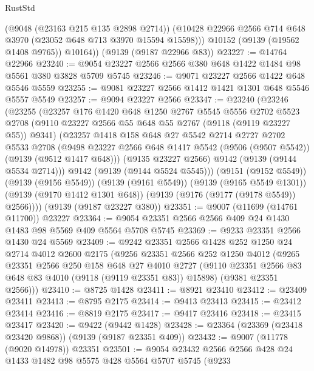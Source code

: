 \begin{lexlean}{RustStd}
\begin{coremodule}
          (@9048 (@23163 @215 @135 @2898 @2714))
          (@10428 @22966 @2566 @714 @648 @3970 (@23052 @648 @713 @3970 @15594 @15598)))
        @10152
        (@9139 (@19562 @1408 @9765))
        @10164))
    (@9139 (@9187 @22966 @83))
@23227 := @14764 @22966
@23240 := @9054 @23227 @2566 @2566 @380 @648 @1422 @1484 @98 @5561 @380 @3828 @5709 @5745
@23246 := @9071 @23227 @2566 @1422 @648 @5546 @5559
@23255 := @9081 @23227 @2566 @1412 @1421 @1301 @648 @5546 @5557 @5549
@23257 := @9094 @23227 @2566
@23347 := @23240
    (@23246
      (@23255
        (@23257
          @176
          @1420
          @648
          @1250
          @2767
          @5545
          @5556
          @2702
          @5523
          @2708
          (@9110 @23227 @2566 @55 @648 @55 @2767 (@9118 (@9119 @23227 @55)) @9341)
          (@23257
            @1418
            @158
            @648
            @27
            @5542
            @2714
            @2727
            @2702
            @5533
            @2708
            (@9498 @23227 @2566 @648 @1417 @5542 (@9506 (@9507 @5542)) (@9139 (@9512 @1417 @648)))
            (@9135 @23227 @2566)
            @9142
            (@9139 (@9144 @5534 @2714)))
          @9142
          (@9139 (@9144 @5524 @5545)))
        (@9151 (@9152 @5549))
        (@9139 (@9156 @5549))
        (@9139 (@9161 @5549))
        (@9139 (@9165 @5549 @1301))
        (@9139 (@9170 @1412 @1301 @648))
        (@9139 (@9176 (@9177 (@9178 @5549)) @2566))))
    (@9139 (@9187 @23227 @380))
@23351 := @9007 (@11699 (@14761 @11700)) @23227
@23364 := @9054 @23351 @2566 @2566 @409 @24 @1430 @1483 @98 @5569 @409 @5564 @5708 @5745
@23369 := @9233 @23351 @2566 @1430 @24 @5569
@23409 := @9242
    @23351
    @2566
    @1428
    @252
    @1250
    @24
    @2714
    @4012
    @2600
    @2175
    (@9256
      @23351
      @2566
      @252
      @1250
      @4012
      (@9265
        @23351
        @2566
        @250
        @158
        @648
        @27
        @4010
        @2727
        (@9110 @23351 @2566 @83 @648 @83 @4010 (@9118 (@9119 @23351 @83)) @15898)
        (@9381 @23351 @2566)))
@23410 := @8725 @1428
@23411 := @8921 @23410
@23412 := @23409 @23411
@23413 := @8795 @2175
@23414 := @9413 @23413
@23415 := @23412 @23414
@23416 := @8819 @2175
@23417 := @9417 @23416
@23418 := @23415 @23417
@23420 := @9422 (@9442 @1428)
@23428 := @23364 (@23369 (@23418 @23420 @9868)) (@9139 (@9187 @23351 @409))
@23432 := @9007 (@11778 (@9020 @14978)) @23351
@23501 := @9054
    @23432
    @2566
    @2566
    @428
    @24
    @1433
    @1482
    @98
    @5575
    @428
    @5564
    @5707
    @5745
    (@9233

\end{coremodule}
\end{lexlean}
